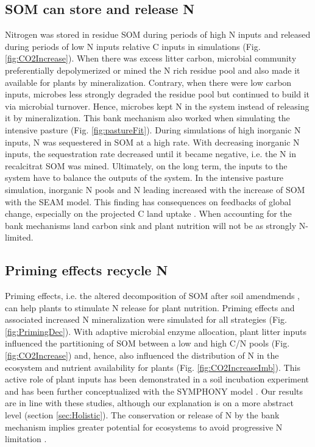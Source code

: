 \subsection{SOM can store and release N}
Nitrogen was stored in residue SOM during periods of high N inputs and
released during periods of low N inputs relative C inputs in simulations (Fig.
\ref{fig:CO2Increase}). When there was excess litter carbon, microbial community
preferentially depolymerized or mined the N rich residue pool and also
made it available for plants by mineralization.
Contrary, when there were low carbon inputs, microbes less strongly degraded the
residue pool but continued to build it via microbial turnover.
Hence, microbes kept N in the system instead of releasing it by mineralization.
This bank mechanism \citep{Perveen14} also worked when simulating the intensive
pasture (Fig. \ref{fig:pastureFit}). During simulations of high inorganic N
inputs, N was sequestered in SOM at a high rate. With decreasing inorganic N
inputs, the sequestration rate decreased until it became negative, i.e. the N
in recalcitrat SOM was mined. Ultimately, on the long term, the inputs to the
system have to balance the outputs of the system. In the intensive pasture simulation,
inorganic N pools and N leading increased with the increase of SOM with the SEAM
model. This finding has consequences on feedbacks of global change, especially
on the projected C land uptake \citep{Friedlingstein14}. When accounting for the
bank mechanisms land carbon sink and plant nutrition will not be as strongly
N-limited.

\subsection{Priming effects recycle N}
Priming effects, i.e. the altered decomposition of SOM after soil amendmends
\citep{Kuzyakov00}, can help plants to stimulate N release for plant nutrition.
Priming effects and associated increased N mineralization were simulated for all
strategies (Fig. \ref{fig:PrimingDec}). With adaptive microbial enzyme
allocation, plant litter inputs influenced the partitioning of SOM between a low
and high C/N pools (Fig. \ref{fig:CO2Increase}) and, hence,
also influenced the distribution of N in the ecosystem and nutrient
availability for plants (Fig. \ref{fig:CO2IncreaseImb}). This active role of
plant inputs has been demonstrated in a soil incubation experiment
\citep{Fontaine11} and has been further conceptualized with the SYMPHONY model
\citep{Perveen14}. Our results are in line with these studies, although our
explanation is on a more abstract level (section \ref{sec:Holistic}). The
conservation or release of N by the bank mechanism implies greater potential
for ecosystems to avoid progressive N limitation \citep{Norby10, Franklin14, Averill15}.

